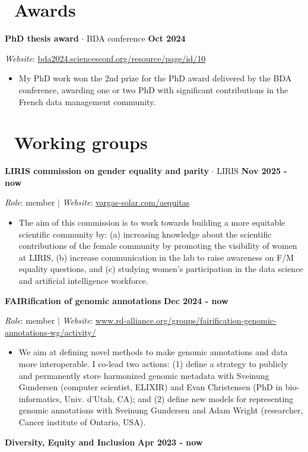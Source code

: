 \documentclass{article}
\begin{document}
\section*{\faTrophy\ Awards}
\noindent\textbf{PhD thesis award} $\cdot$ BDA conference \hfill \textbf{Oct 2024}


\noindent\textit{Website}: \href{https://bda2024.sciencesconf.org/resource/page/id/10}{bda2024.sciencesconf.org/resource/page/id/10}

\begin{itemize}
\item My PhD work won the 2nd prize for the PhD award delivered by the BDA conference, awarding one or two PhD with significant contributions in the French data management community.
\end{itemize}
\section*{\faGroup \ Working groups}
\noindent\textbf{LIRIS commission on gender equality and parity} $\cdot$ LIRIS \hfill \textbf{Nov 2025 - now}


\noindent\textit{Role}: member $|$ \textit{Website}: \href{https://vargas-solar.com/aequitas}{vargas-solar.com/aequitas}

\begin{itemize}
\item The aim of this commission is to work towards building a more equitable scientific community by: (a) increasing knowledge about the scientific contributions of the female community by promoting the visibility of women at LIRIS, (b) increase communication in the lab to raise awareness on F/M equality questions, and (c) studying women's participation in the data science and artificial intelligence workforce.
\end{itemize}
\vspace{1em}\noindent\textbf{FAIRification of genomic annotations} \hfill \textbf{Dec 2024 - now}


\noindent\textit{Role}: member $|$ \textit{Website}: \href{https://www.rd-alliance.org/groups/fairification-genomic-annotations-wg/activity/}{www.rd-alliance.org/groups/fairification-genomic-annotations-wg/activity/}

\begin{itemize}
\item We aim at defining novel methods to make genomic annotations and data more interoperable. I co-lead two actions: (1) define a strategy to publicly and permanently store harmonized genomic metadata with Sveinung Gundersen (computer scientist, ELIXIR) and Evan Christensen (PhD in bio-informatics, Univ. d'Utah, CA); and (2) define new models for representing genomic annotations with Sveinung Gundersen and Adam Wright (researcher, Cancer institute of Ontario, USA).
\end{itemize}
\vspace{1em}\noindent\textbf{Diversity, Equity and Inclusion} \hfill \textbf{Apr 2023 - now}
\end{document}
